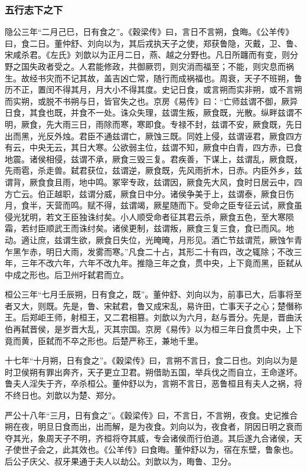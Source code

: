 \documentclass[]{article}
\begin{document}
\hypertarget{header-n2385}{%
\subsubsection{五行志下之下}\label{header-n2385}}

隐公三年``二月己巳，日有食之''。《穀梁传》曰，言日不言朔，食晦。《公羊传》曰，食二日。董仲舒、刘向以为，其后戎执天子之使，郑获鲁隐，灭戴，卫、鲁、宋咸杀君。《左氏》刘歆以为正月二日，燕、越之分野也。凡日所躔而有变，则分野之国失政者受之。人君能修政，共御厥罚，则灾消而福至；不能，则灾息而祸生。故经书灾而不记其故，盖吉凶亡常，随行而成祸福也。周衰，天子不班朔，鲁历不正，置闰不得其月，月大小不得其度。史记日食，或言朔而实非朔，或不言朔而实朔，或脱不书朔与日，皆官失之也。京房《易传》曰：``亡师兹谓不御，厥异日食，其食也既，并食不一处。诛众失理，兹谓生叛，厥食既，光散。纵畔兹谓不明，厥食，先大雨三日，雨除而寒，寒即食。专禄不封，兹谓不安，厥食既，先日出而黑，光反外烛。君臣不通兹谓亡，厥蚀三既。同姓上侵，兹谓诬君，厥食四方有云，中央无云，其日大寒。公欲弱主位，兹谓不知，厥食中白青，四方赤，已食地震。诸侯相侵，兹谓不承，厥食三毁三复。君疾善，下谋上，兹谓乱，厥食既，先雨雹，杀走兽。弑君获位，兹谓逆，厥食既，先风雨折木，日赤。内臣外乡，兹谓背，厥食食且雨，地中鸣。冢宰专政，兹谓因，厥食先大风，食时日居云中，四方亡云。伯正越职，兹谓分威，厥食日中分。诸侯争美于上，兹谓泰，厥食日伤月，食半，天营而鸣。赋不得，兹谓竭，厥星随而下。受命之臣专征云试，厥食虽侵光犹明，若文王臣独诛纣矣。小人顺受命者征其君云杀，厥食五色，至大寒陨霜，若纣臣顺武王而诛纣矣。诸侯更制，兹谓叛，厥食三复三食，食已而风。地动。適让庶，兹谓生欲，厥食日失位，光晻晻，月形见。酒亡节兹谓荒，厥蚀乍青乍黑乍赤，明日大雨，发雾而寒。''凡食二十占，其形二十有四，改之辄除；不改三年，三年不改六年，六年不改九年。推隐三年之食，贯中央，上下竟而黑，臣弑从中成之形也。后卫州吁弑君而立。

桓公三年``七月壬辰朔，日有食之，既''。董仲舒、刘向以为，前事已大，后事将至者又大，则既。先是，鲁、宋弑君，鲁又成宋乱，易许田，亡事天子之心；楚僭称王。后郑岠王师，射桓王，又二君相篡。刘歆以为六月，赵与晋分。先是，晋曲沃伯再弑晋侯，是岁晋大乱，灭其宗国。京房《易传》以为桓三年日食贯中央，上下竟而黄，臣弑而不卒之形也。后楚严称王，兼地千里。

十七年``十月朔，日有食之''。《穀梁传》曰，言朔不言日，食二日也。刘向以为是时卫侯朔有罪出奔齐，天子更立卫君。朔借助五国，举兵伐之而自立，王命遂坏。鲁夫人淫失于齐，卒杀桓公。董仲舒以为，言朔不言日，恶鲁桓且有夫人之祸，将不终日也。刘歆以为楚、郑分。

严公十八年``三月，日有食之''。《穀梁传》曰，不言日，不言朔，夜食。史记推合朔在夜，明旦日食而出，出而解，是为夜食。刘向以为，夜食者，阴因日明之衰而夺其光，象周天子不明，齐桓将夺其威，专会诸侯而行伯道。其后遂九合诸侯，天子使世子会之，此其效也。《公羊传》曰食晦。董仲舒以为，宿在东壁，鲁象也。后公子庆父、叔牙果通于夫人以劫公。刘歆以为，晦鲁、卫分。
\end{document}
